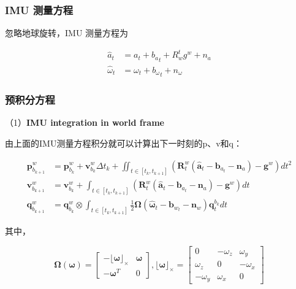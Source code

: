 \documentclass[12pt,a4paper]{article}
\begin{document}
\subsubsection{IMU 测量方程}

忽略地球旋转，IMU 测量方程为

\begin{equation}
\begin{aligned}
\hat{a}_t &= a_t + {b_a}_t + R_w^t g^w + n_a \\
\hat{\omega}_t &= \omega_t + {b_{\omega}}_t + n_{\omega}
\end{aligned}
\end{equation}

\subsubsection{预积分方程}

（1）\textbf{IMU integration in world frame}

由上面的IMU测量方程积分就可以计算出下一时刻的p、v和q：  

\begin{equation}
\begin{aligned} 
\mathbf{p}_{b_{k+1}}^{w}&=
\mathbf{p}_{b_{k}}^{w} + \mathbf{v}_{b_{k}}^{w} \Delta t_{k} + \iint_{t \in\left[t_{k}, t_{k+1}\right]}\left(\mathbf{R}_{t}^{w}\left(\hat{\mathbf{a}}_{t}-\mathbf{b}_{a_{t}}-\mathbf{n}_{a}\right)-\mathbf{g}^{w}\right) d t^{2} \\ 
\mathbf{v}_{b_{k+1}}^{w}&=
\mathbf{v}_{b_{k}}^{w}+\int_{t \in\left[t_{k}, t_{k+1}\right]}\left(\mathbf{R}_{t}^{w}\left(\hat{\mathbf{a}}_{t}-\mathbf{b}_{a_{t}}-\mathbf{n}_{a}\right)-\mathbf{g}^{w}\right) d t \\
\mathbf{q}_{b_{k+1}}^{w}&=
\mathbf{q}_{b_{k}}^{w} \otimes \int_{t \in\left[t_{k}, t_{k+1}\right]} \frac{1}{2} \boldsymbol{\Omega}\left(\hat{\boldsymbol{\omega}}_{t}-\mathbf{b}_{w_{t}}-\mathbf{n}_{w}\right) \mathbf{q}_{t}^{b_{k}} d t
\end{aligned}
\end{equation}

其中，

\begin{equation}
\boldsymbol{\Omega}(\boldsymbol{\omega})=
\left[\begin{array}{cc}
{-\lfloor\boldsymbol{\omega}\rfloor_{ \times}} & {\boldsymbol{\omega}} \\ 
{-\boldsymbol{\omega}^{T}} & {0}
\end{array}\right],
\lfloor\boldsymbol{\omega}\rfloor_{ \times}=
\left[\begin{array}{ccc}
{0} & {-\omega_{z}} & {\omega_{y}} \\ 
{\omega_{z}} & {0} & {-\omega_{x}} \\ 
{-\omega_{y}} & {\omega_{x}} & {0}
\end{array}\right]
\end{equation}
\end{document}
